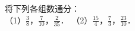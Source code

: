 
将下列各组数通分：\\
（1）$\frac{3}{8}$，$\frac{7}{10}$，$\frac{2}{35}$．\hspace{8em}    （2）$\frac{15}{4}$，$\frac{7}{3}$，$\frac{23}{10}$． \\

